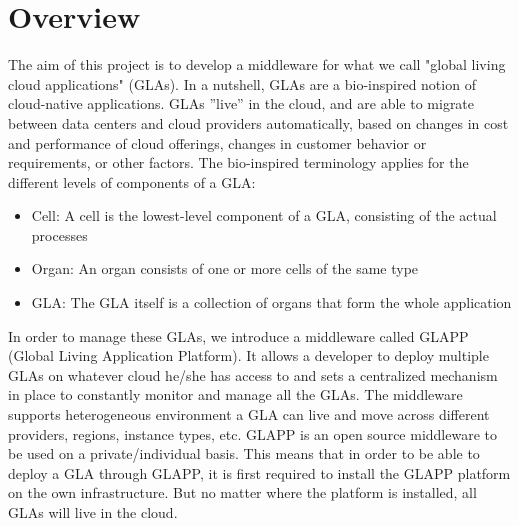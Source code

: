 \documentclass{seal_thesis}
\begin{document}
\section{Overview}

The aim of this project is to develop a middleware for what we call "global living cloud applications" (GLAs).
In a nutshell, GLAs are a bio-inspired notion of cloud-native applications. GLAs ''live'' in the cloud, and are able to migrate between data centers and cloud providers automatically, based on changes in cost and performance of cloud offerings, changes in customer behavior or requirements, or other factors.
The bio-inspired terminology applies for the different levels of components of a GLA:

\begin{itemize}
	\item Cell: A cell is the lowest-level component of a GLA, consisting of the actual processes 
	\item Organ: An organ consists of one or more cells of the same type 
	\item GLA: The GLA itself is a collection of organs that form the whole application
\end{itemize}

In order to manage these GLAs, we introduce a middleware called GLAPP (Global Living Application Platform).
It allows a developer to deploy multiple GLAs on whatever cloud he/she has access to and sets a centralized mechanism in place to constantly monitor and manage all the GLAs.
The middleware supports heterogeneous environment a GLA can live and move across different providers, regions, instance types, etc.
GLAPP is an open source middleware to be used on a private/individual basis.
This means that in order to be able to deploy a GLA through GLAPP, it is first required to install the GLAPP platform on the own infrastructure.
But no matter where the platform is installed, all GLAs will live in the cloud.
\end{document}
